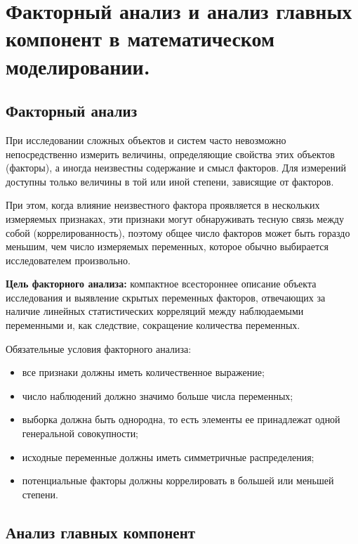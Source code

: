\section{Факторный анализ и анализ главных компонент в математическом моделировании.}

\subsection*{Факторный анализ}

При исследовании сложных объектов и систем часто невозможно непосредственно измерить величины, определяющие свойства этих объектов (факторы), а иногда неизвестны содержание и смысл факторов. Для измерений доступны только величины в той или иной степени, зависящие от факторов.

При этом, когда влияние неизвестного фактора проявляется в нескольких измеряемых признаках, эти признаки могут обнаруживать тесную связь между собой (коррелированность), поэтому общее число факторов может быть гораздо меньшим, чем число измеряемых переменных, которое обычно выбирается исследователем произвольно.

\textbf{Цель факторного анализа:} компактное всестороннее описание объекта исследования и выявление скрытых переменных факторов, отвечающих за наличие линейных статистических корреляций между наблюдаемыми переменными и, как следствие, сокращение количества переменных.

Обязательные условия факторного анализа:
\begin{itemize}
  \item все признаки должны иметь количественное выражение;
  \item число наблюдений должно значимо больше числа переменных;
  \item выборка должна быть однородна, то есть элементы ее принадлежат одной генеральной совокупности;
  \item исходные переменные должны иметь симметричные распределения;
  \item потенциальные факторы должны коррелировать в большей или меньшей степени.
\end{itemize}

\subsection*{Анализ главных компонент}

